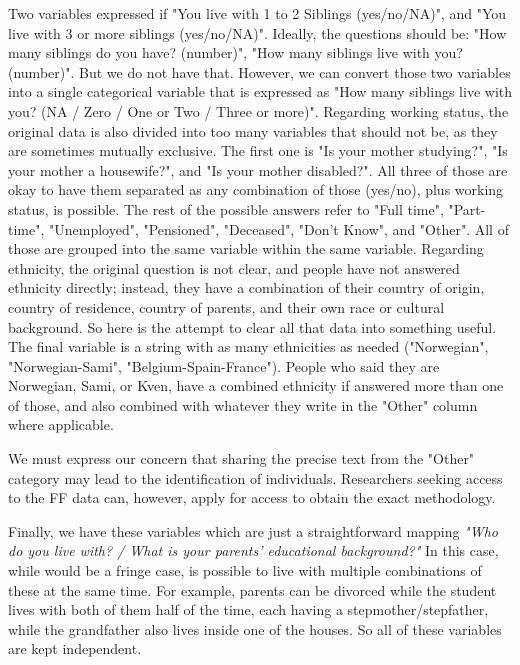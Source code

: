 Two variables expressed if "You live with 1 to 2 Siblings (yes/no/NA)", and "You live with 3 or more siblings (yes/no/NA)". Ideally, the questions should be: "How many siblings do you have? (number)", "How many siblings live with you? (number)". But we do not have that. However, we can convert those two variables into a single categorical variable that is expressed as "How many siblings live with you? (NA / Zero / One or Two / Three or more)". Regarding working status, the original data is also divided into too many variables that should not be, as they are sometimes mutually exclusive. The first one is "Is your mother studying?", "Is your mother a housewife?", and "Is your mother disabled?". All three of those are okay to have them separated as any combination of those (yes/no), plus working status, is possible. The rest of the possible answers refer to "Full time", "Part-time", "Unemployed", "Pensioned", "Deceased", "Don't Know", and "Other". All of those are grouped into the same variable within the same variable. Regarding ethnicity, the original question is not clear, and people have not answered ethnicity directly; instead, they have a combination of their country of origin, country of residence, country of parents, and their own race or cultural background. So here is the attempt to clear all that data into something useful. The final variable is a string with as many ethnicities as needed ("Norwegian", "Norwegian-Sami", "Belgium-Spain-France"). People who said they are Norwegian, Sami, or Kven, have a combined ethnicity if answered more than one of those, and also combined with whatever they write in the "Other" column where applicable.

We must express our concern that sharing the precise text from the "Other" category may lead to the identification of individuals. Researchers seeking access to the FF data can, however, apply for access to obtain the exact methodology. 


Finally, we have these variables which are just a straightforward mapping \textit{"Who do you live with? / What is your parents' educational background?"} In this case, while would be a fringe case, is possible to live with multiple combinations of these at the same time. For example, parents can be divorced while the student lives with both of them half of the time, each having a stepmother/stepfather, while the grandfather also lives inside one of the houses. So all of these variables are kept independent.


